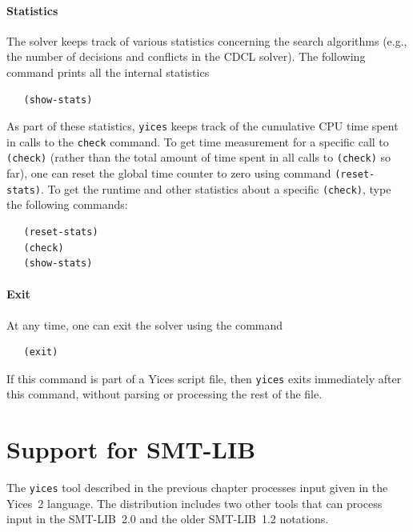 \documentclass[11pt,twoside,fleqn,openright,titlepage]{cslreport}
\begin{document}
\subsubsection*{Statistics}

The solver keeps track of various statistics concerning the search
algorithms (e.g., the number of decisions and conflicts in the CDCL
solver). The following command prints all the internal statistics
\begin{small}
\begin{verbatim}
   (show-stats)
\end{verbatim}
\end{small}
As part of these statistics, \texttt{yices} keeps track of the
cumulative CPU time spent in calls to the \texttt{check} command.  To
get time measurement for a specific call to \texttt{(check)} (rather
than the total amount of time spent in all calls to \texttt{(check)}
so far), one can reset the global time counter to zero using command
\texttt{(reset-stats)}. To get the runtime and other statistics about
a specific \texttt{(check)}, type the following commands:
\begin{small}
\begin{verbatim}
   (reset-stats)
   (check)
   (show-stats)
\end{verbatim}
\end{small}

\subsubsection*{Exit}

At any time, one can exit the solver using the command
\begin{small}
\begin{verbatim}
   (exit)
\end{verbatim}
\end{small}
If this command is part of a Yices script file, then \texttt{yices}
exits immediately after this command, without parsing or processing the
rest of the file.


\chapter{Support for SMT-LIB}
\label{yices-smt}

The \texttt{yices} tool described in the previous chapter processes
input given in the Yices~2 language. The distribution includes two
other tools that can process input in the SMT-LIB~2.0 and the older
SMT-LIB~1.2 notations.
\end{document}
